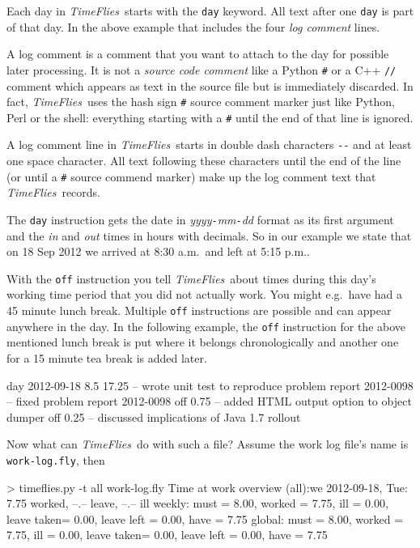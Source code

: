 \documentclass[11pt]{article}
\newcommand{\timeflies}{\emph{TimeFlies}}
\begin{document}
Each day in \timeflies\ starts with the \verb-day- keyword. All text after one \verb-day- is part of that day. In the above example that includes the four \emph{log comment} lines.

A log comment is a comment that you want to attach to the day for possible later processing. It is not a \emph{source code comment} like a Python \verb-#- or a C++ \verb-//- comment which appears as text in the source file but is immediately discarded. In fact, \timeflies\ uses the hash sign \verb-#- source comment marker just like Python, Perl or the shell: everything starting with a \verb-#- until the end of that line is ignored.

A log comment line in \timeflies\ starts in double dash characters \verb=--= and at least one space character. All text following these characters until the end of the line (or until a \verb-#- source commend marker) make up the log comment text that \timeflies\ records.

The \verb-day- instruction gets the date in \emph{yyyy}\verb=-=\emph{mm}\verb=-=\emph{dd} format as its first argument and the \emph{in} and \emph{out} times in hours with decimals. So in our example we state that on 18 Sep 2012 we arrived at 8:30 a.m.\ and left at 5:15 p.m..

With the \verb-off- instruction you tell \timeflies\ about times during this day's working time period that you did not actually work. You might e.g.\ have had a 45 minute lunch break. Multiple \verb-off- instructions are possible and can appear anywhere in the day. In the following example, the \verb-off- instruction for the above mentioned lunch break is put where it belongs chronologically and another one for a 15 minute tea break is added later.

\begin{inputfile}
day 2012-09-18 8.5 17.25
-- wrote unit test to reproduce problem report 2012-0098
-- fixed problem report 2012-0098
off 0.75
-- added HTML output option to object dumper
off 0.25
-- discussed implications of Java 1.7 rollout
\end{inputfile}

Now what can \timeflies\ do with such a file? Assume the work log file's name is \verb:work-log.fly:, then

\begin{inputfile}
> timeflies.py -t all work-log.fly
Time at work overview (all):we
2012-09-18, Tue:  7.75 worked, --.-- leave, --.-- ill
weekly: must =   8.00, worked =   7.75, ill =   0.00, leave taken=   0.00, leave left =   0.00, have =   7.75
global: must =   8.00, worked =   7.75, ill =   0.00, leave taken=   0.00, leave left =   0.00, have =   7.75
\end{inputfile}
\end{document}
